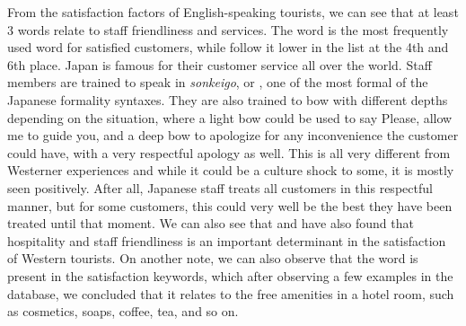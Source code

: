 From the satisfaction factors of English-speaking tourists, we can see that at least 3 words relate to staff friendliness and services. The word \DIFdelbegin {}\DIFdelend \DIFaddbegin {}\DIFaddend is the most frequently used word for satisfied customers, while \DIFdelbegin {}\DIFdelend \DIFaddbegin {}\DIFaddend follow it lower in the list at the 4th and 6th place. Japan is famous for their customer service all over the world. Staff members are trained to speak in \textit{sonkeigo}, or \DIFdelbegin {}\DIFdelend \DIFaddbegin {}\DIFaddend , one of the most formal of the Japanese formality syntaxes. They are also trained to bow with different depths depending on the situation, where a light bow could be used to say \DIFdelbegin {}\DIFdelend \DIFaddbegin {}\DIFaddend Please, allow me to guide you\DIFdelbegin {}\DIFdelend \DIFaddbegin {}\DIFaddend , and a deep bow to apologize for any inconvenience the customer could have, with a very respectful apology as well. This is all very different from Westerner experiences and while it could be a culture shock to some, it is mostly seen positively. After all, Japanese staff treats all customers in this respectful manner, but for some customers, this could very well be the best they have been treated until that moment. We can also see that \cite{kozak2002} and \cite{shanka2004} have also found that hospitality and staff friendliness is an important determinant in the satisfaction of Western tourists. On another note, we can also observe that the word \DIFdelbegin {}\DIFdelend \DIFaddbegin {}\DIFaddend is present in the satisfaction keywords, which after observing a few examples in the database, we concluded that it relates to the free amenities in a hotel room, such as cosmetics, soaps, coffee, tea, and so on. 

